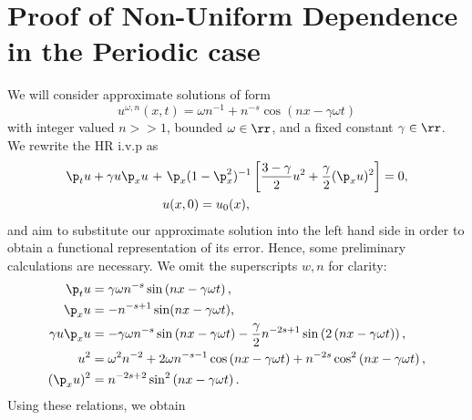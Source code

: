 	\section{Proof of Non-Uniform Dependence in the Periodic case} 
	We will consider approximate solutions of form
	\begin{equation}
		\label{approx-solutions-form}
		u^{\omega,n}(x,t) = \omega n^{-1} + n^{-s} \cos \left( nx - \gamma \omega t
		\right) 
	\end{equation}
	with integer valued $n >>1$, bounded $\omega \in \rr$, and a fixed constant $\gamma \in \rr$. We rewrite 
	the HR i.v.p as
	\begin{align}
			 \p_t u + \gamma u \p_x u \ + & \ \p_x (1 - \p_x^2)^{-1} 
			 \left[ \frac{3 - \gamma}{2}u^2 +
			\frac{\gamma}{2}(\p_x u)^2 \right] = 0,
			\label{hyperelastic-rod-equation}
			\\
			& {u(x,0) = u_0(x)},
			\label{init-cond}
			\end{align}
	and aim to substitute our approximate solution into the left hand side 
	in order to obtain a functional representation of its error. Hence, some 
	preliminary calculations are necessary. We omit the superscripts $w,n$ for clarity: 
	\begin{equation}
		\begin{split}
			 \p_t u
			 & = \gamma \omega n^{-s} \sin\left( nx - \gamma \omega t \right),
			\\
			 \p_x u
			 & = -n^{-s+1} \sin(nx - \gamma \omega t),
			\\
			\gamma u \p_x u
			& = - \gamma \omega n^{-s} \sin\left( nx - \gamma
			\omega t \right) - \frac{\gamma}{2}n^{-2s+1}\sin\left( 2\left( nx - \gamma
			\omega t
			\right) \right),
			\\
			u^2 
			& = \omega^2 n^{-2} + 2\omega n^{-s -1} \cos \left( nx - \gamma \omega t
			\right) + n^{-2s} \cos^2\left( nx - \gamma \omega t \right),
			\\
			(\p_x u)^2 
			& = n^{-2s+2} \sin^2\left( nx - \gamma \omega t \right).
			\label{calculation of functional representation of error}
		\end{split}
	\end{equation}
	Using these relations, we obtain
